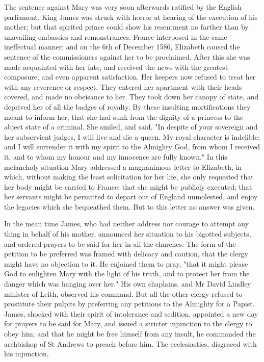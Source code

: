 \documentclass{article}
\begin{document}
The sentence against Mary was very soon afterwards ratified by the English parliament. King James was struck with horror at hearing of the execution of his mother; but that spirited prince could show his resentment no farther than by unavailing embassies and remonstrances. France interposed in the same ineffectual manner; and on the 6th of December 1586, Elizabeth caused the sentence of the commissioners against her to be proclaimed. After this she was made acquainted with her fate, and received the news with the greatest composure, and even apparent satisfaction. Her keepers now refused to treat her with any reverence or respect. They entered her apartment with their heads covered, and made no obeisance to her. They took down her canopy of state, and deprived her of all the badges of royalty. By these insulting mortifications they meant to inform her, that she had sunk from the dignity of a princess to the abject state of a criminal. She smiled, and said, "In despite of your sovereign and her subservient judges, I will live and die a queen. My royal character is indelible; and I will surrender it with my spirit to the Almighty God, from whom I received it, and to whom my honour and my innocence are fully known." In this melancholy situation Mary addressed a magnanimous letter to Elizabeth, in which, without making the least solicitation for her life, she only requested that her body might be carried to France; that she might be publicly executed; that her servants might be permitted to depart out of England unmolested, and enjoy the legacies which she bequeathed them. But to this letter no answer was given.

In the mean time James, who had neither address nor courage to attempt any thing in behalf of his mother, announced her situation to his bigotted subjects, and ordered prayers to be said for her in all the churches. The form of the petition to be preferred was framed with delicacy and caution, that the clergy might have no objection to it. He enjoined them to pray, "that it might please God to enlighten Mary with the light of his truth, and to protect her from the danger which was hanging over her." His own chaplains, and Mr David Lindley minister of Leith, observed his command. But all the other clergy refused to prostitute their pulpits by preferring any petitions to the Almighty for a Papist. James, shocked with their spirit of intolerance and sedition, appointed a new day for prayers to be said for Mary, and issued a stricter injunction to the clergy to obey him; and that he might be free himself from any insult, he commanded the archbishop of St Andrews to preach before him. The ecclesiastics, disgraced with his injunction,
\end{document}
